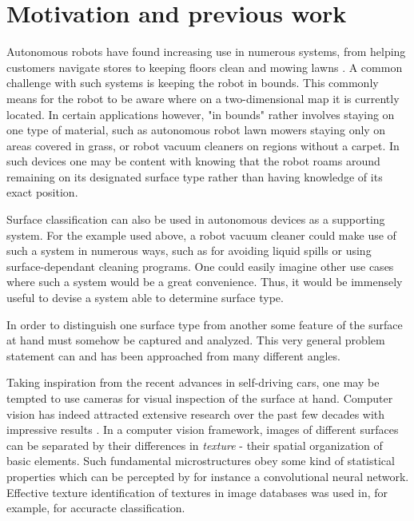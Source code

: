\section{Motivation and previous work}

Autonomous robots have found increasing use in numerous systems, from helping customers navigate stores \citep{mcsweeney_2018} to keeping floors clean \citep{ifr_press_release_2016} and mowing lawns \citep{udelhofen_2018}. A common challenge with such systems is keeping the robot in bounds. This commonly means for the robot to be aware where on a two-dimensional map it is currently located. In certain applications however, "in bounds" rather involves staying on one type of material, such as autonomous robot lawn mowers staying only on areas covered in grass, or robot vacuum cleaners on regions without a carpet. In such devices one may be content with knowing that the robot roams around remaining on its designated surface type rather than having knowledge of its exact position. 

Surface classification can also be used in autonomous devices as a supporting system. For the example used above, a robot vacuum cleaner could make use of such a system in numerous ways, such as for avoiding liquid spills or using surface-dependant cleaning programs. One could easily imagine other use cases where such a system would be a great convenience. Thus, it would be immensely useful to devise a system able to determine surface type. 

In order to distinguish one surface type from another some feature of the surface at hand must somehow be captured and analyzed. This very general problem statement can and has been approached from many different angles. 

Taking inspiration from the recent advances in self-driving cars, one may be tempted to use cameras for visual inspection of the surface at hand. Computer vision has indeed attracted extensive research over the past few decades with impressive results \citep{liu_chen_fieguth_zhao_chellappa_pietikäinen_2018}. In a computer vision framework, images of different surfaces can be separated by their differences in \emph{texture} - their spatial organization of basic elements. Such fundamental microstructures obey some kind of statistical properties which can be percepted by for instance a convolutional neural network. Effective texture identification of textures in image databases was used in, for example, \citep{do_vetterli_2002} for accuracte classification. 


